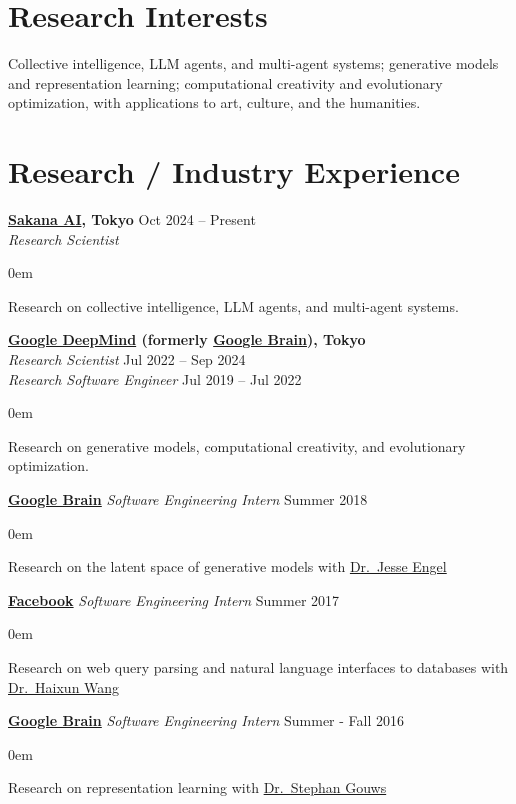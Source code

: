 \documentclass[line,margin]{cv}
\makeatletter
\newenvironment{block}
{
  \begin{addmargin}[2em]{0em}%
}
{
  \end{addmargin}
}
\newcommand{\Sakana}{\href{https://sakana.ai/}{Sakana AI}}
\newcommand{\GoogleBrain}{\href{http://research.google.com/teams/brain/}{Google Brain}}
\newcommand{\GoogleDeepMind}{\href{https://www.deepmind.com/}{Google DeepMind}}
\newcommand{\Facebook}{\href{https://www.facebook.com/}{Facebook}}
\newcommand{\MyWebsite}{\href{https://alantian.net}{alantian.net}}
\newcommand{\MyMail}{\href{mailto:alan.yt.tian@gmail.com}{\nolinkurl{alan.yt.tian@gmail.com}}}
\newcommand{\Haixun}{\href{http://haixun.olidu.com/}{Dr.\ Haixun Wang}}
\newcommand{\sgouws}{\href{http://research.google.com/pubs/StephanGouws.html}{Dr.\ Stephan Gouws}}
\newcommand{\jesseengel}{\href{https://ai.google/research/people/JesseEngel}{Dr.\ Jesse Engel}}
\makeatother
\begin{document}

\address{Research Scientist \textbullet{} \Sakana{}  / \MyMail{} / \MyWebsite}

\begin{resume}

\section{Research Interests}
  Collective intelligence, LLM agents, and multi-agent systems; generative models and representation learning; computational creativity and evolutionary optimization, with applications to art, culture, and the humanities.

\section{Research / Industry Experience}


  {\bf \Sakana{}, Tokyo} \hfill Oct 2024 -- Present\\
  {\itshape Research Scientist}
  \begin{block}
    Research on collective intelligence, LLM agents, and multi-agent systems.
  \end{block}

  {\bf \GoogleDeepMind{} (formerly \GoogleBrain), Tokyo}\\
  {\itshape Research Scientist} \hfill Jul 2022 -- Sep 2024\\
  {\itshape Research Software Engineer} \hfill Jul 2019 -- Jul 2022
  \begin{block}
    Research on generative models, computational creativity, and evolutionary optimization.
  \end{block}

  {\bf \GoogleBrain} {\itshape Software Engineering Intern} \hfill Summer 2018
  \begin{block}
    Research on the latent space of generative models with \jesseengel
  \end{block}

  {\bf \Facebook} {\itshape Software Engineering Intern} \hfill Summer 2017
  \begin{block}
    Research on web query parsing and natural language interfaces to databases with \Haixun
  \end{block}

  {\bf \GoogleBrain} {\itshape Software Engineering Intern} \hfill Summer - Fall 2016
  \begin{block}
    Research on representation learning with \sgouws
  \end{block}


\end{resume}
\end{document}
